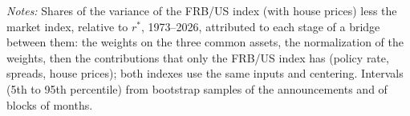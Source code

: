\begin{table}[tbp]\centering\small
\caption{From the Market Index to the FRB/US Index: Shares of the Difference}\label{tab:bridge}
\begin{flushleft}\footnotesize\textit{Notes:} Shares of the variance of the FRB/US index (with house prices) less the market index, relative to $r^*$, 1973--2026, attributed to each stage of a bridge between them: the weights on the three common assets, the normalization of the weights, then the contributions that only the FRB/US index has (policy rate, spreads, house prices); both indexes use the same inputs and centering. Intervals (5th to 95th percentile) from bootstrap samples of the announcements and of blocks of months.\end{flushleft}
\end{table}
